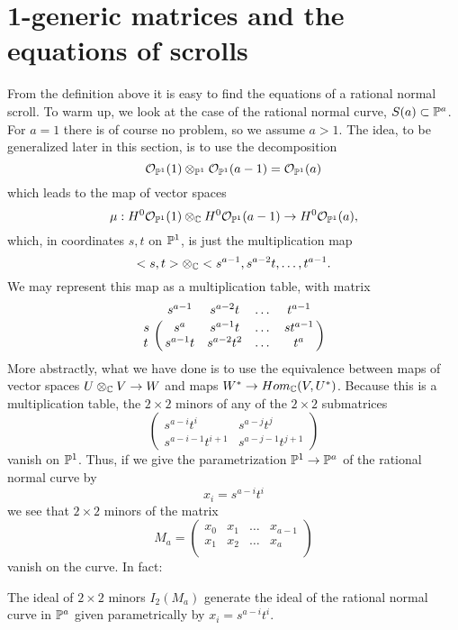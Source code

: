 \section{1-generic matrices and the equations of scrolls}
From the definition above it is easy to find the equations of a rational normal scroll. To warm up, we look at the case of the rational normal curve, $S(a)\subset \PP^{a}$. For $a=1$ there is of course no problem, so we assume $a>1$. The idea, to be generalized later in this section, is to use the decomposition
$$
 \cO_{\PP^{1}}(1)\otimes_{\PP^{1}} \cO_{\PP^{1}}(a-1) = \cO_{\PP^{1}}(a) 
$$
which leads to the map of vector spaces
$$
 \mu: H^{0} \cO_{\PP^{1}}(1)\otimes_{\CC} H^{0}\cO_{\PP^{1}}(a-1) \to H^{0}\cO_{\PP^{1}}(a),
$$
which, in coordinates $s,t$ on $\PP^{1}$, is just the multiplication map
$$
<s,t> \otimes_{\CC}<s^{a-1}, s^{a-2}t,\dots,t^{a-1}.
$$
We may represent this map as a multiplication table, with matrix
$$
\bordermatrix{
& s^{a-1}&s^{a-2}t&\dots&t^{a-1}\cr
s&  s^{a}& s^{a-1}t&\dots&st^{a-1}\cr
t&  s^{a-1}t& s^{a-2}t^{2}&\dots&t^{a}\cr
}$$
More abstractly, what we have done is to use the equivalence between maps of vector spaces $U\otimes_{\CC}V\to W$ and maps
$W^{*}\to Hom_{\CC}(V, U^{*})$.
Because this is a multiplication table, the $2\times 2$ minors of any of the $2\times 2$ submatrices
$$
\begin{pmatrix}
s^{a-i}t^{i}& s^{a-j}t^{j}\\
s^{a-i-1}t^{i+1}& s^{a-j-1}t^{j+1}
\end{pmatrix}
$$
vanish on $\PP^{1}$. Thus, if we give the parametrization $\PP^{1}\to \PP^{a}$ of the rational normal curve  by
$$
x_{i} = s^{a-i}t^{i}
$$
we see that $2\times 2$ minors of the 
matrix
$$
M_{a} = 
\begin{pmatrix}
 x_{0}&x_{1}&\dots&x_{a-1}\\
  x_{1}&x_{2}&\dots&x_{a}\\
\end{pmatrix}
$$
vanish on  the  curve. In fact:
\begin{proposition}\label{RNC generators}
 The ideal of $2\times 2$ minors $I_{2}(M_{a})$ generate the ideal of the rational normal curve in $\PP^{a}$ given parametrically by
 $x_{i} = s^{a-i}t^{i}$.
\end{proposition}
